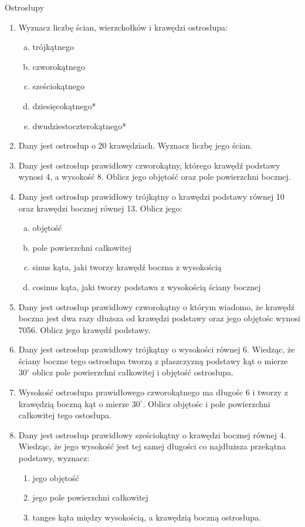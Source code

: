 \documentclass[12pt,a4paper]{article}
\begin{document}
	\newpage
	\begin{center}
		\large Ostrosłupy
	\end{center}
	\begin{enumerate}[1.]
	\item Wyznacz liczbę ścian, wierzchołków i krawędzi ostrosłupa:
	\begin{enumerate}[a)]
		\item trójkątnego
		\item czworokątnego
		\item sześciokątnego
		\item dziesięcokątnego*
		\item dwudziestoczterokątnego*
	\end{enumerate}
	
	\item Dany jest ostrosłup o 20 krawędziach. Wyznacz liczbę jego ścian.

	\item Dany jest ostrosłup prawidłowy czworokątny, którego krawędź podstawy wynosi 4, a wysokość 8. Oblicz jego objętość oraz pole powierzchni bocznej.
	
	\item Dany jest ostrosłup prawidłowy trójkątny o krawędzi podstawy równej 10 oraz krawędzi bocznej równej 13. Oblicz jego:
	\begin{enumerate}[a)]
		\item objętość
		\item pole powierzchni całkowitej
		\item sinus kąta, jaki tworzy krawędź boczna z wysokością
		\item cosinus kąta, jaki tworzy podstawa z wysokością ściany bocznej
	\end{enumerate}

	\item Dany jest ostrosłup prawidłowy czworokątny o którym wiadomo, że krawędź boczna jest dwa razy dłuższa od krawędzi podstawy oraz jego objętośc wynosi 7056. Oblicz jego krawędź podstawy.

	\item Dany jest ostrosłup prawidłowy trójkątny o wysokości równej 6. Wiedząc, że ściany boczne tego ostrosłupa tworzą z płaszczyzną podstawy kąt o mierze $30^\circ$ oblicz pole powierzchni całkowitej i objętość ostrosłupa.

	\item Wysokość ostrosłupa prawidłowego czworokątnego ma długośc 6 i tworzy z krawędzią boczną kąt o mierze $30^\circ$. Oblicz objętośc i pole powierzchni całkowitej tego ostosłupa.

	\item Dany jest ostrosłup prawidłowy sześciokątny o krawędzi bocznej równej 4. Wiedząc, że jego wysokość jest tej samej długości co najdłuższa przekątna podstawy, wyznacz:
	\begin{enumerate}[option]
		\item jego objętość
		\item jego pole powierzchni całkowitej
		\item tanges kąta między wysokością, a krawędzią boczną ostrosłupa.
	\end{enumerate}

	\end{enumerate}
\end{document}
